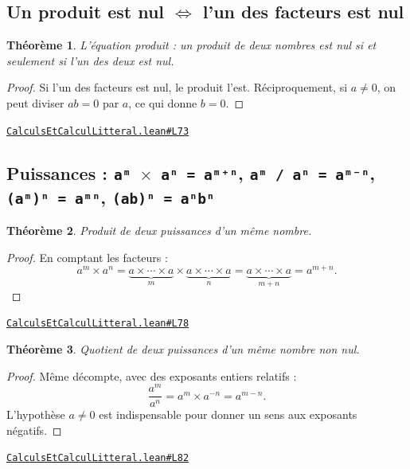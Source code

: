 \documentclass[11pt,a4paper]{article}
\theoremstyle{definition}
\theoremstyle{plain}
\newtheorem{theoreme}{Théorème}
\newcommand{\source}[2]{\par\smallskip\noindent\hfill{\footnotesize\href{#1}{\texttt{#2}}}\par\smallskip}
\begin{document}
\subsection{Un produit est nul \(\iff\) l'un des facteurs est nul}

\begin{theoreme}
L'équation produit : un produit de deux nombres est nul si et seulement si l'un des
deux est nul.
\end{theoreme}

\begin{proof}
Si l'un des facteurs est nul, le produit l'est. Réciproquement, si $a \ne 0$, on peut
diviser $ab = 0$ par $a$, ce qui donne $b = 0$.
\end{proof}
\source{https://github.com/Commutator-IO/learn-lean/blob/main/courses/01-college/01-nombres-et-calculs/CalculsEtCalculLitteral.lean\#L73}{CalculsEtCalculLitteral.lean\#L73}

\subsection{Puissances : \texttt{aᵐ \(\times\) aⁿ = aᵐ⁺ⁿ}, \texttt{aᵐ / aⁿ = aᵐ⁻ⁿ}, \texttt{(aᵐ)ⁿ = aᵐⁿ}, \texttt{(ab)ⁿ = aⁿbⁿ}}

\begin{theoreme}
Produit de deux puissances d'un même nombre.
\end{theoreme}

\begin{proof}
En comptant les facteurs :
\[
a^m \times a^n
  = \underbrace{a \times \cdots \times a}_{m}
    \times \underbrace{a \times \cdots \times a}_{n}
  = \underbrace{a \times \cdots \times a}_{m+n}
  = a^{m+n} .
\]
\end{proof}
\source{https://github.com/Commutator-IO/learn-lean/blob/main/courses/01-college/01-nombres-et-calculs/CalculsEtCalculLitteral.lean\#L78}{CalculsEtCalculLitteral.lean\#L78}

\begin{theoreme}
Quotient de deux puissances d'un même nombre non nul.
\end{theoreme}

\begin{proof}
Même décompte, avec des exposants entiers relatifs :
\[
\frac{a^m}{a^n} = a^m \times a^{-n} = a^{m-n} .
\]
L'hypothèse $a \ne 0$ est indispensable pour donner un sens aux exposants négatifs.
\end{proof}
\source{https://github.com/Commutator-IO/learn-lean/blob/main/courses/01-college/01-nombres-et-calculs/CalculsEtCalculLitteral.lean\#L82}{CalculsEtCalculLitteral.lean\#L82}
\end{document}
